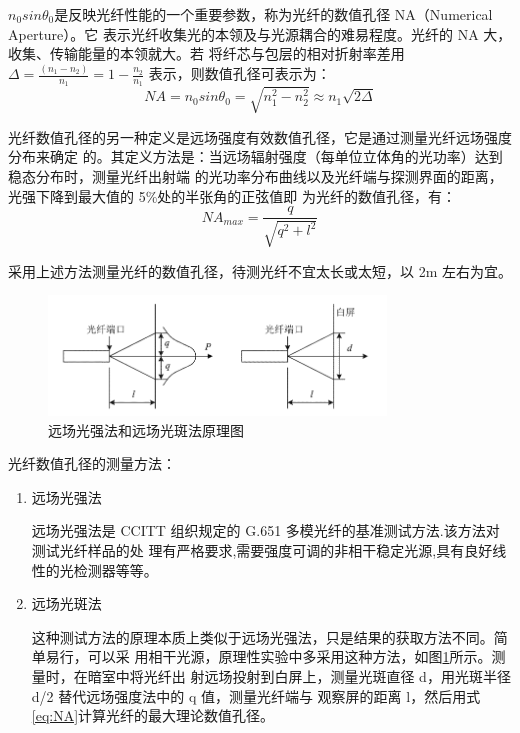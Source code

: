 \documentclass[10pt,a4paper,twoside,UTF8]{ctexart}
\begin{document}
$n_0 sin \theta_0 $是反映光纤性能的一个重要参数，称为光纤的数值孔径 NA（Numerical Aperture）。它
表示光纤收集光的本领及与光源耦合的难易程度。光纤的 NA 大，收集、传输能量的本领就大。若
将纤芯与包层的相对折射率差用
$\varDelta=\frac{(n_1-n_2)}{n_1}=1-\frac{n_2}{n_1}$
表示，则数值孔径可表示为：
\begin{equation}
	NA=n_0 sin\theta_0 =\sqrt{n^{2}_1-n^{2}_2}\approx n_1 \sqrt{2\varDelta}
\end{equation}

光纤数值孔径的另一种定义是远场强度有效数值孔径，它是通过测量光纤远场强度分布来确定
的。其定义方法是：当远场辐射强度（每单位立体角的光功率）达到稳态分布时，测量光纤出射端
的光功率分布曲线以及光纤端与探测界面的距离，光强下降到最大值的 5\%处的半张角的正弦值即
为光纤的数值孔径，有：
\begin{equation}
	NA_{max}= \frac{q}{\sqrt{q^2+l^2}}
	\label{eq:NA}
\end{equation}

采用上述方法测量光纤的数值孔径，待测光纤不宜太长或太短，以 2m 左右为宜。

\begin{figure}[H]
	\centering
	\includegraphics[width=0.8\textwidth]{img//3.png}
	\caption{远场光强法和远场光斑法原理图}
	\label{fig:3}
\end{figure}

光纤数值孔径的测量方法：
\begin{enumerate}
	\item 远场光强法
	
	远场光强法是 CCITT 组织规定的 G.651 多模光纤的基准测试方法.该方法对测试光纤样品的处
	理有严格要求,需要强度可调的非相干稳定光源,具有良好线性的光检测器等等。
	\item 远场光斑法

	这种测试方法的原理本质上类似于远场光强法，只是结果的获取方法不同。简单易行，可以采
	用相干光源，原理性实验中多采用这种方法，如图\ref{fig:3}所示。测量时，在暗室中将光纤出
	射远场投射到白屏上，测量光斑直径 d，用光斑半径 d/2 替代远场强度法中的 q 值，测量光纤端与
	观察屏的距离 l，然后用式\ref{eq:NA}计算光纤的最大理论数值孔径。	
\end{enumerate}
\end{document}
